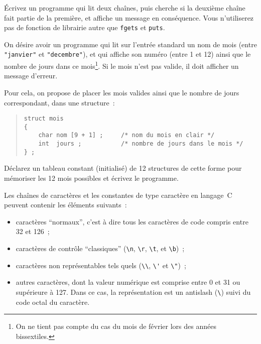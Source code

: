 \question
    \label {strbrk}

Écrivez un programme qui lit deux chaînes, puis cherche si la deuxième
chaîne fait partie de la première, et affiche un message en conséquence.
Vous n'utiliserez pas de fonction de librairie autre que {\tt fgets} et
{\tt puts}.


\question

On désire avoir un programme qui lit sur l'entrée standard un nom de mois
(entre \verb:"janvier":  et \verb:"decembre":), et qui affiche son
numéro (entre 1 et 12) ainsi que le nombre de jours dans ce
mois\footnote {On ne tient pas compte du cas du mois de février lors
des années bissextiles.}. Si le mois n'est pas valide,
il doit afficher un message d'erreur.

Pour cela, on propose de placer les mois valides ainsi que le nombre de
jours correspondant, dans une structure~:

\begin {quote}
\small
\begin {verbatim}
struct mois
{
    char nom [9 + 1] ;     /* nom du mois en clair */
    int  jours ;           /* nombre de jours dans le mois */
} ;
\end{verbatim}
\end {quote}

Déclarez un tableau constant (initialisé) de 12 structures de cette
forme pour mémoriser les 12 mois possibles et écrivez le programme.


\question
    \label {backslash}

Les chaînes de caractères et les constantes de type caractère en
langage~C peuvent contenir les éléments suivants~:

\begin {itemize}
    \item caractères ``normaux'', c'est à dire tous les caractères de
	code compris entre 32 et 126~;
    \item caractères de contrôle ``classiques''
	(\verb:\n:, \verb:\r:, \verb:\t:, et \verb:\b:)~;
    \item caractères non représentables tels quels
	(\verb:\\:, \verb:\': et \verb:\":)~;
    \item autres caractères, dont la valeur numérique est comprise entre
	0 et 31 ou supérieure à 127. Dans ce cas, la représentation est
	un antislash (\verb:\:) suivi du code octal du caractère.
\end {itemize}

